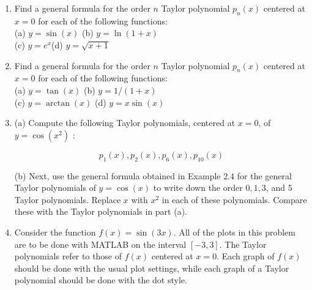 \documentclass[../main.tex]{subfiles}
\begin{document}
\begin{enumerate}
(c) Repeat part (a) using the fourth-order Taylor polynomial.

\item Find a general formula for the order $n$ Taylor polynomial $p_{n}(x)$ centered at $x=0$ for each of the following functions:\\

(a) $y=\sin (x)$ \hspace{3.75cm}(b) $y=\ln (1+x)$\\
(c) $y=e^{x}$\hspace{4.5cm}(d) $y=\sqrt{x+1}$

\item Find a general formula for the order $n$ Taylor polynomial $p_{n}(x)$ centered at $x=0$ for each of the following functions:\\
(a) $y=\tan (x)$ \hspace{3.75cm}(b) $y=1 /(1+x)$\\
(c) $y=\arctan (x)$ \hspace{3.30cm}(d) $y=x \sin (x)$

\item (a) Compute the following Taylor polynomials, centered at $x=0$, of $y=\cos \left(x^{2}\right)$ :

$$
p_{1}(x), p_{2}(x), p_{6}(x), p_{10}(x)
$$

(b) Next, use the general formula obtained in Example $2.4$ for the general Taylor polynomials of $y=\cos (x)$ to write down the order $0,1,3$, and 5 Taylor polynomials. Replace $x$ with $x^{2}$ in each of these polynomials. Compare these with the Taylor polynomials in part (a). 

\item Consider the function $f(x)=\sin (3 x)$. All of the plots in this problem are to be done with MATLAB on the interval $[-3,3]$. The Taylor polynomials refer to those of $f(x)$ centered at $x=0$. Each graph of $f(x)$ should be done with the usual plot settings, while each graph of a Taylor polynomial should be done with the dot style.


\end{enumerate}
\end{document}
